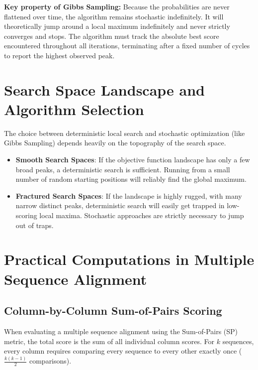 \sta \textbf{Key property of Gibbs Sampling:} Because the probabilities are never flattened over time, the algorithm remains stochastic indefinitely. It will theoretically jump around a local maximum indefinitely and never strictly converges and stops. The algorithm must track the absolute best score encountered throughout all iterations, terminating after a fixed number of cycles to report the highest observed peak.

\section{Search Space Landscape and Algorithm Selection}
The choice between deterministic local search and stochastic optimization (like Gibbs Sampling) depends heavily on the topography of the search space.

\begin{itemize}
  \item \textbf{Smooth Search Spaces}: If the objective function landscape has only a few broad peaks, a deterministic search is sufficient. Running from a small number of random starting positions will reliably find the global maximum.
  \item \textbf{Fractured Search Spaces}: If the landscape is highly rugged, with many narrow distinct peaks, deterministic search will easily get trapped in low-scoring local maxima. Stochastic approaches are strictly necessary to jump out of traps.
\end{itemize}

\section{Practical Computations in Multiple Sequence Alignment}

\subsection{Column-by-Column Sum-of-Pairs Scoring}
When evaluating a multiple sequence alignment using the Sum-of-Pairs (SP) metric, the total score is the sum of all individual column scores. For $k$ sequences, every column requires comparing every sequence to every other exactly once ($\frac{k(k-1)}{2}$ comparisons).

